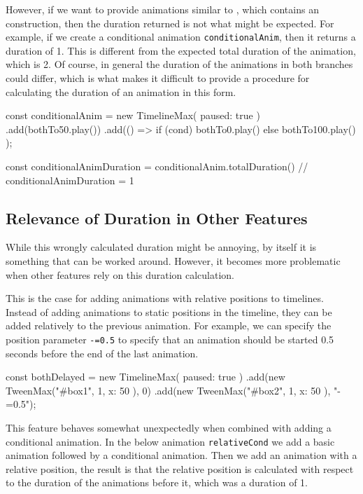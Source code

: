 However, if we want to provide animations similar to , which contains an  construction, then the duration returned is not what might be expected. For example, if we create a conditional animation \texttt{conditionalAnim}, then it returns a duration of 1. This is different from the expected total duration of the animation, which is 2. Of course, in general the duration of the animations in both branches could differ, which is what makes it difficult to provide a procedure for calculating the duration of an animation in this form.

\begin{js}
const conditionalAnim = new TimelineMax({ paused: true })
  .add(bothTo50.play())
  .add(() => { if (cond) { bothTo0.play()   }
               else      { bothTo100.play() } });

const conditionalAnimDuration = conditionalAnim.totalDuration()
// conditionalAnimDuration = 1
\end{js}

\subsection{Relevance of Duration in Other Features}

While this wrongly calculated duration might be annoying, by itself it is something that can be worked around. However, it becomes more problematic when other features rely on this duration calculation.

This is the case for adding animations with relative positions to timelines. Instead of adding animations to static positions in the timeline, they can be added relatively to the previous animation. For example, we can specify the position parameter \texttt{-=0.5} to specify that an animation should be started 0.5 seconds before the end of the last animation.

\begin{js}
const bothDelayed = new TimelineMax({ paused: true })
  .add(new TweenMax("#box1", 1, { x: 50 }), 0)
  .add(new TweenMax("#box2", 1, { x: 50 }), "-=0.5");
\end{js}

This feature behaves somewhat unexpectedly when combined with adding a conditional animation. In the below animation \texttt{relativeCond} we add a basic animation followed by a conditional animation. Then we add an animation with a relative position, the result is that the relative position is calculated with respect to the duration of the animations before it, which was a duration of 1.


